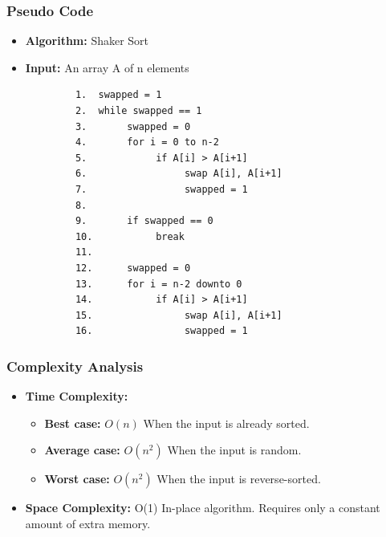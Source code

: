     \subsubsection{Pseudo Code}
        \begin{itemize}
            \item \textbf{Algorithm:} Shaker Sort
            \item \textbf{Input:} An array A of n elements
        \end{itemize}
        \begin{verbatim}
            1.  swapped = 1
            2.  while swapped == 1
            3.       swapped = 0
            4.       for i = 0 to n-2
            5.            if A[i] > A[i+1]
            6.                 swap A[i], A[i+1]
            7.                 swapped = 1
            8.
            9.       if swapped == 0
            10.           break
            11.
            12.      swapped = 0
            13.      for i = n-2 downto 0
            14.           if A[i] > A[i+1]
            15.                swap A[i], A[i+1]
            16.                swapped = 1
        \end{verbatim}
    \subsubsection{Complexity Analysis}
        \begin{itemize}
            \item \textbf{Time Complexity:}
            \begin{itemize}
                \item \textbf{Best case:} $O(n)$
                    \subitem When the input is already sorted.
                \item \textbf{Average case:} $O(n^2)$
                    \subitem When the input is random.
                \item \textbf{Worst case:} $O(n^2)$ 
                    \subitem When the input is reverse-sorted.
            \end{itemize}
            \item \textbf{Space Complexity:} O(1) 
                \subitem In-place algorithm. Requires only a constant amount of extra memory.
        \end{itemize}
        
